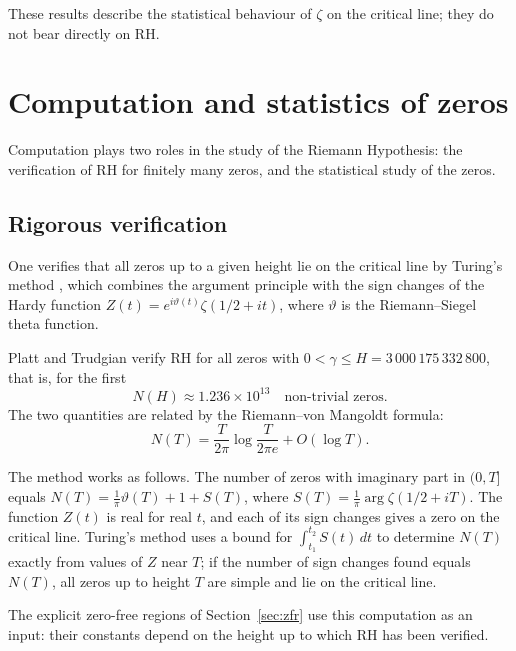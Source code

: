 \documentclass[11pt]{amsart}
\theoremstyle{definition}
\theoremstyle{remark}
\begin{document}
These results describe the statistical behaviour of $\zeta$ on the critical line; they do not bear directly on RH.

\section{Computation and statistics of zeros}\label{sec:comp}

Computation plays two roles in the study of the Riemann Hypothesis: the verification of RH for finitely many zeros, and the statistical study of the zeros.

\subsection{Rigorous verification}\label{sec:verification}

One verifies that all zeros up to a given height lie on the critical line by Turing's method \cite{turing1953}, which combines the argument principle with the sign changes of the Hardy function $Z(t) = e^{i\vartheta(t)}\zeta(1/2+it)$, where $\vartheta$ is the Riemann--Siegel theta function.

Platt and Trudgian \cite{platt2021} verify RH for all zeros with $0<\gamma\le H=3\,000\,175\,332\,800$, that is, for the first
\[
N(H) \approx 1.236 \times 10^{13} \quad \text{non-trivial zeros.}
\]
The two quantities are related by the Riemann--von Mangoldt formula:
\[
N(T) = \frac{T}{2\pi}\log\frac{T}{2\pi e} + O(\log T).
\]

The method works as follows. The number of zeros with imaginary part in $(0, T]$ equals $N(T) = \frac{1}{\pi}\vartheta(T) + 1 + S(T)$, where $S(T) = \frac{1}{\pi}\arg\zeta(1/2 + iT)$. The function $Z(t)$ is real for real $t$, and each of its sign changes gives a zero on the critical line. Turing's method uses a bound for $\int_{t_1}^{t_2}S(t)\,dt$ to determine $N(T)$ exactly from values of $Z$ near $T$; if the number of sign changes found equals $N(T)$, all zeros up to height $T$ are simple and lie on the critical line.

The explicit zero-free regions of Section~\ref{sec:zfr} use this computation as an input: their constants depend on the height up to which RH has been verified.
\end{document}
